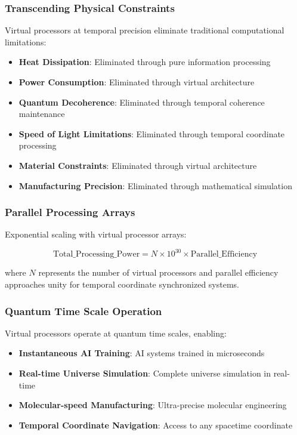 \documentclass[11pt]{article}
\theoremstyle{remark}
\begin{document}
\subsubsection{Transcending Physical Constraints}

Virtual processors at temporal precision eliminate traditional computational limitations:

\begin{itemize}
\item \textbf{Heat Dissipation}: Eliminated through pure information processing
\item \textbf{Power Consumption}: Eliminated through virtual architecture
\item \textbf{Quantum Decoherence}: Eliminated through temporal coherence maintenance
\item \textbf{Speed of Light Limitations}: Eliminated through temporal coordinate processing
\item \textbf{Material Constraints}: Eliminated through virtual architecture
\item \textbf{Manufacturing Precision}: Eliminated through mathematical simulation
\end{itemize}

\subsubsection{Parallel Processing Arrays}

Exponential scaling with virtual processor arrays:

$$\text{Total\_Processing\_Power} = N \times 10^{30} \times \text{Parallel\_Efficiency}$$

where $N$ represents the number of virtual processors and parallel efficiency approaches unity for temporal coordinate synchronized systems.

\subsubsection{Quantum Time Scale Operation}

Virtual processors operate at quantum time scales, enabling:

\begin{itemize}
\item \textbf{Instantaneous AI Training}: AI systems trained in microseconds
\item \textbf{Real-time Universe Simulation}: Complete universe simulation in real-time
\item \textbf{Molecular-speed Manufacturing}: Ultra-precise molecular engineering
\item \textbf{Temporal Coordinate Navigation}: Access to any spacetime coordinate
\end{itemize}
\end{document}
